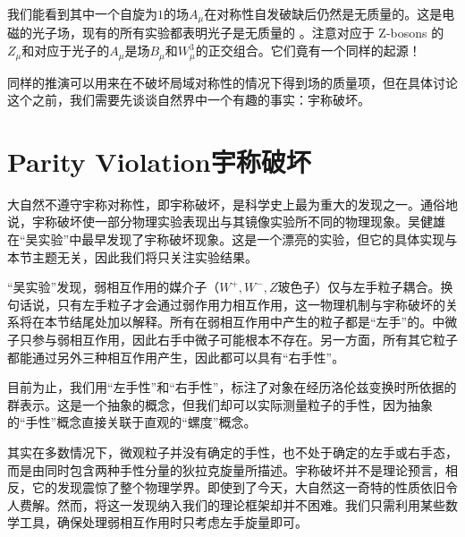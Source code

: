 我们能看到其中一个自旋为$1$的场$A_\mu$在对称性自发破缺后仍然是无质量的。这是电磁的光子场，现有的所有实验都表明光子是无质量的%
%
。注意对应于 Z-bosons 的$Z_\mu$和对应于光子的$A_\mu$是场$B_\mu$和$W_\mu^3$的正交组合。它们竟有一个同样的起源！

同样的推演可以用来在不破坏局域\sutw 对称性的情况下得到\spint 场的质量项，但在具体讨论这个之前，我们需要先谈谈自然界中一个有趣的事实：宇称破坏。

\section[宇称破坏]{Parity Violation\quad 宇称破坏}
\label{sec7.4}
大自然不遵守宇称对称性，即宇称破坏，是科学史上最为重大的发现之一。通俗地说，宇称破坏使一部分物理实验表现出与其镜像实验所不同的物理现象。吴健雄在“吴实验”中最早发现了宇称破坏现象。这是一个漂亮的实验，但它的具体实现与本节主题无关，因此我们将只关注实验结果。

“吴实验”发现，弱相互作用的媒介子（$W^+, W^-, Z$玻色子）仅与左手粒子耦合。换句话说，只有左手粒子才会通过弱作用力相互作用，这一物理机制与宇称破坏的关系将在本节结尾处加以解释。所有在弱相互作用中产生的粒子都是“左手”的。中微子只参与弱相互作用，因此右手中微子可能根本不存在。另一方面，所有其它粒子都能通过另外三种相互作用产生，因此都可以具有“右手性”。

目前为止，我们用“左手性”和“右手性”，标注了对象在经历洛伦兹变换时所依据的群表示。这是一个抽象的概念，但我们却可以实际测量粒子的手性，因为抽象的“手性”概念直接关联于直观的“螺度”概念。

其实在多数情况下，微观粒子并没有确定的手性，也不处于确定的左手或右手态，而是由同时包含两种手性分量的狄拉克旋量所描述。宇称破坏并不是理论预言，相反，它的发现震惊了整个物理学界。即使到了今天，大自然这一奇特的性质依旧令人费解。然而，将这一发现纳入我们的理论框架却并不困难。我们只需利用某些数学工具，确保处理弱相互作用时只考虑左手旋量即可。

